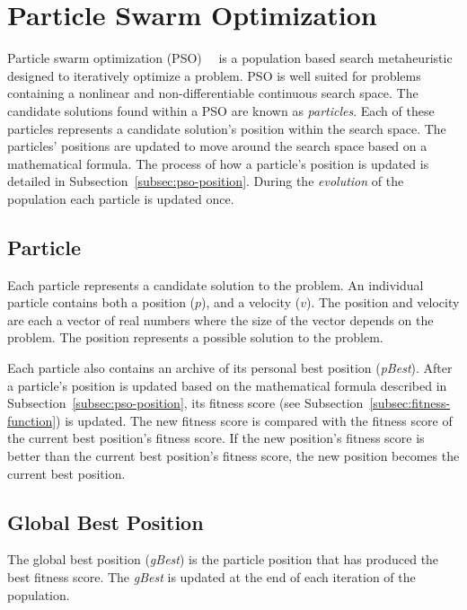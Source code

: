 \section{Particle Swarm Optimization}
\label{sec:pso}

Particle swarm optimization (PSO)~\cite{kennedy2010particle}~\cite{poli2007particle} is a population based search metaheuristic designed to iteratively optimize a problem. PSO is well suited for problems containing a nonlinear and non-differentiable continuous search space. The candidate solutions found within a PSO are known as \textit{particles}. Each of these particles represents a candidate solution's position within the search space. The particles' positions are updated to move around the search space based on a mathematical formula. The process of how a particle's position is updated is detailed in Subsection~\ref{subsec:pso-position}. During the \textit{evolution} of the population each particle is updated once.

\subsection{Particle}

Each particle represents a candidate solution to the problem. An individual particle contains both a position ($p$), and a velocity ($v$). The position and velocity are each a vector of real numbers where the size of the vector depends on the problem. The position represents a possible solution to the problem.

Each particle also contains an archive of its personal best position (\textit{pBest}). After a particle's position is updated based on the mathematical formula described in Subsection~\ref{subsec:pso-position}, its fitness score (see Subsection~\ref{subsec:fitness-function}) is updated. The new fitness score is compared with the fitness score of the current best position's fitness score. If the new position's fitness score is better than the current best position's fitness score, the new position becomes the current best position.

\subsection{Global Best Position}

The global best position (\textit{gBest}) is the particle position that has produced the best fitness score. The \textit{gBest} is updated at the end of each iteration of the population.

